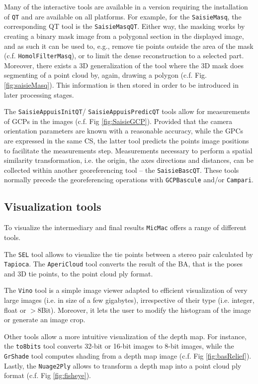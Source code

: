 \documentclass[twocolumn]{bmcart}%
\begin{document}
Many of the interactive tools are available in a version requiring the installation of {\tt QT} and are available on all platforms. For example, for the {\tt SaisieMasq}, the corresponding QT tool is the {\tt SaisieMasqQT}. Either way, the masking works by creating a binary mask image from a polygonal section in the displayed image, and as such it can be used to, e.g., remove tie points outside the area of the mask (c.f. {\tt HomolFilterMasq}), or to limit the dense reconstruction to a selected part. Moreover, there exists a 3D generalization of the tool where the 3D mask does segmenting of a point cloud by, again, drawing a polygon (c.f. Fig. \ref{fig:saisieMasq}).  This information is then stored in order to be introduced in later processing stages.\par 
% 
The {\tt SaisieAppuisInitQT}/ {\tt Saisie\-AppuisPredicQT} tools allow for measurements of GCPs in the images (c.f. Fig \ref{fig:SaisieGCP}). Provided that the camera orientation parameters are known with a reasonable accuracy, while the GPCs are expressed in the same CS, the latter tool predicts the points image positions to facilitate the measurements step. Measurements necessary to perform a spatial similarity transformation, i.e. the origin, the axes directions and distances, can be collected within another georeferencing tool -- the {\tt SaisieBascQT}. These tools normally precede the georeferencing operations with {\tt GCPBascule} and/or {\tt Campari}. 

\subsection*{Visualization tools}
To visualize the intermediary and final results {\tt MicMac} offers a range of different tools.\par 
%
The {\tt SEL} tool allows to visualize the tie points between a stereo pair calculated by {\tt Tapioca}. The {\tt AperiCloud} tool converts the result of the BA, that is the poses and 3D tie points, to the point cloud ply format.%

The {\tt Vino} tool is a simple image viewer adapted to efficient visualization of very large images (i.e. in size of a few gigabytes), irrespective of their type (i.e. integer, float or $>$8Bit). Moreover, it lets the user to modify the histogram of the image or generate an image crop.

Other tools allow a more intuitive visualization of the depth map. For instance, the {\tt to8bits} tool converts 32-bit or 16-bit images to 8-bit images, while the {\tt GrShade} tool computes shading from a depth map image (c.f. Fig \ref{fig:basRelief}). Lastly, the {\tt Nuage2Ply} allows to transform a depth map into a point cloud ply format (c.f. Fig \ref{fig:fisheye}).
\end{document}

